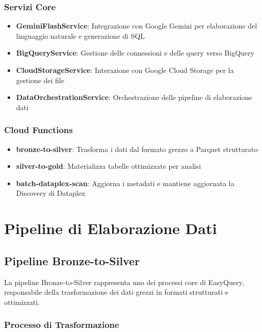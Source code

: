 \documentclass[11pt,a4paper,twoside]{report}
\begin{document}
\subsection{Servizi Core}
\begin{itemize}
    \item \textbf{GeminiFlashService}: Integrazione con Google Gemini per elaborazione del linguaggio naturale e generazione di SQL
    \item \textbf{BigQueryService}: Gestione delle connessioni e delle query verso BigQuery
    \item \textbf{CloudStorageService}: Interazione con Google Cloud Storage per la gestione dei file
    \item \textbf{DataOrchestrationService}: Orchestrazione delle pipeline di elaborazione dati
\end{itemize}

\subsection{Cloud Functions}
\begin{itemize}
    \item \textbf{bronze-to-silver}: Trasforma i dati dal formato grezzo a Parquet strutturato
    \item \textbf{silver-to-gold}: Materializza tabelle ottimizzate per analisi
    \item \textbf{batch-dataplex-scan}: Aggiorna i metadati e mantiene aggiornata la Discovery di Dataplex
\end{itemize}

\chapter{Pipeline di Elaborazione Dati}

\section{Pipeline Bronze-to-Silver}

La pipeline Bronze-to-Silver rappresenta uno dei processi core di EasyQuery, responsabile della trasformazione dei dati grezzi in formati strutturati e ottimizzati.

\subsection{Processo di Trasformazione}
\end{document}
